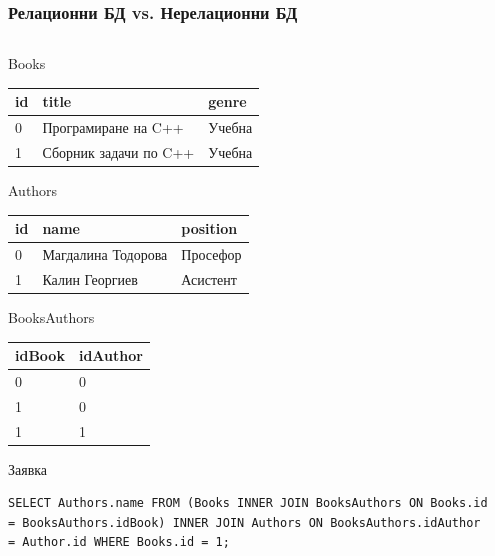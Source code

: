 \documentclass{beamer}
\begin{document}
\begin{frame}[fragile]
\frametitle{Релационни БД vs. Нерелационни БД}

\begin{columns}[t]
  \begin{column}{0.4\textwidth}




Books

\begin{tabular}{l l l}
id & title & genre \\ \hline
0 & Програмиране на C++ & Учебна \\
1 & Сборник задачи по C++ & Учебна
\end{tabular}

\vspace{0.2cm}

Authors

\begin{tabular}{l l l}
id & name & position \\ \hline
0 & Магдалина Тодорова &  Просефор \\
1 & Калин Георгиев & Асистент
\end{tabular}


\vspace{0.2cm}

BooksAuthors

\begin{tabular}{l l}
idBook & idAuthor \\ \hline
0 & 0 \\
1 & 0 \\
1 & 1
\end{tabular}

\pause

\vspace{0.2cm}
Заявка


\begin{lstlisting}[breaklines=true]
SELECT Authors.name FROM (Books INNER JOIN BooksAuthors ON Books.id = BooksAuthors.idBook) INNER JOIN Authors ON BooksAuthors.idAuthor = Author.id WHERE Books.id = 1;
\end{lstlisting}

\end{column}

\pause

\begin{column}{0.5\textwidth}


\end{column}
\end{columns}
\end{frame}
\end{document}
